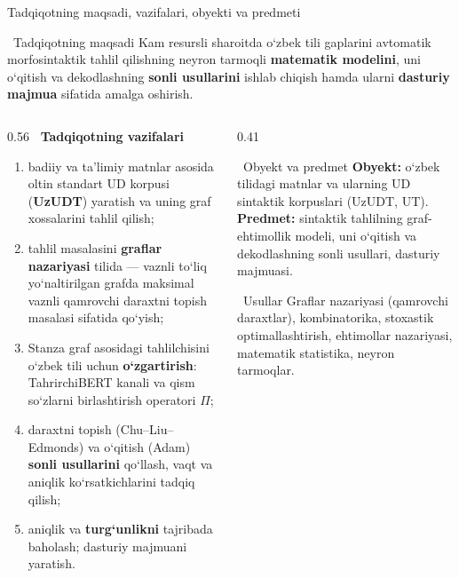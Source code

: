 \documentclass[aspectratio=169,11pt]{beamer}
\begin{document}
\begin{frame}{Tadqiqotning maqsadi, vazifalari, obyekti va predmeti}
  \begin{block}{\faBullseye\ Tadqiqotning maqsadi}
    \scriptsize Kam resursli sharoitda o‘zbek tili gaplarini avtomatik morfosintaktik tahlil qilishning neyron tarmoqli \textbf{matematik modelini}, uni o‘qitish va dekodlashning \textbf{sonli usullarini} ishlab chiqish hamda ularni \textbf{dasturiy majmua} sifatida amalga oshirish.
  \end{block}
  \begin{columns}[T,onlytextwidth]
  \begin{column}{0.56\textwidth}
    {\color{bmain}\bfseries\small \faTasks\ Tadqiqotning vazifalari}\\[1pt]
    \scriptsize
    \begin{enumerate}\setlength{\itemsep}{2pt}
      \item badiiy va ta’limiy matnlar asosida oltin standart UD korpusi (\textbf{UzUDT}) yaratish va uning graf xossalarini tahlil qilish;
      \item tahlil masalasini \textbf{graflar nazariyasi} tilida --- vaznli to‘liq yo‘naltirilgan grafda maksimal vaznli qamrovchi daraxtni topish masalasi sifatida qo‘yish;
      \item Stanza graf asosidagi tahlilchisini o‘zbek tili uchun \textbf{o‘zgartirish}: TahrirchiBERT kanali va qism so‘zlarni birlashtirish operatori $\Pi$;
      \item daraxtni topish (Chu--Liu--Edmonds) va o‘qitish (Adam) \textbf{sonli usullarini} qo‘llash, vaqt va aniqlik ko‘rsatkichlarini tadqiq qilish;
      \item aniqlik va \textbf{turg‘unlikni} tajribada baholash; dasturiy majmuani yaratish.
    \end{enumerate}
  \end{column}
  \begin{column}{0.41\textwidth}
    \begin{block}{\faMicroscope\ Obyekt va predmet}
      \scriptsize \textbf{Obyekt:} o‘zbek tilidagi matnlar va ularning UD sintaktik korpuslari (UzUDT, UT).\\[2pt]
      \textbf{Predmet:} sintaktik tahlilning graf-ehtimollik modeli, uni o‘qitish va dekodlashning sonli usullari, dasturiy majmuasi.
    \end{block}
    \begin{block}{\faCogs\ Usullar}
      \scriptsize Graflar nazariyasi (qamrovchi daraxtlar), kombinatorika, stoxastik optimallashtirish, ehtimollar nazariyasi, matematik statistika, neyron tarmoqlar.
    \end{block}
  \end{column}
  \end{columns}
\end{frame}
\end{document}
